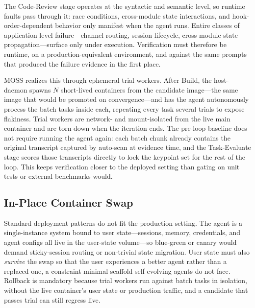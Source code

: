 The Code-Review stage operates at the syntactic and semantic level, so runtime faults pass through it: race conditions, cross-module state interactions, and hook-order-dependent behavior only manifest when the agent runs. Entire classes of application-level failure---channel routing, session lifecycle, cross-module state propagation---surface only under execution. Verification must therefore be runtime, on a production-equivalent environment, and against the same prompts that produced the failure evidence in the first place.

MOSS realizes this through ephemeral trial workers. After Build, the host-daemon spawns $N$ short-lived containers from the candidate image---the same image that would be promoted on convergence---and has the agent autonomously process the batch tasks inside each, repeating every task several trials to expose flakiness. Trial workers are network- and mount-isolated from the live main container and are torn down when the iteration ends. The pre-loop baseline does not require running the agent again: each batch chunk already contains the original transcript captured by auto-scan at evidence time, and the Task-Evaluate stage scores those transcripts directly to lock the keypoint set for the rest of the loop. This keeps verification closer to the deployed setting than gating on unit tests or external benchmarks would.

\subsection{In-Place Container Swap}
\label{subsec:swap}

Standard deployment patterns do not fit the production setting. The agent is a single-instance system bound to user state---sessions, memory, credentials, and agent configs all live in the user-state volume---so blue-green or canary would demand sticky-session routing or non-trivial state migration. User state must also \emph{survive} the swap so that the user experiences a better agent rather than a replaced one, a constraint minimal-scaffold self-evolving agents do not face. Rollback is mandatory because trial workers run against batch tasks in isolation, without the live container's user state or production traffic, and a candidate that passes trial can still regress live.

